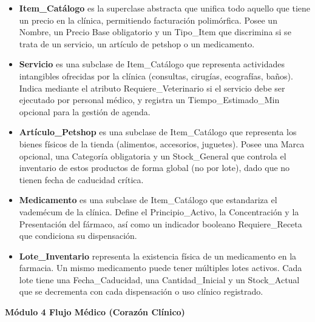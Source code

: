 \begin{itemize}
	\item \textbf{Item\_Catálogo} es la superclase abstracta que unifica todo aquello que tiene un precio en la clínica, permitiendo facturación polimórfica. Posee un Nombre, un Precio Base obligatorio y un Tipo\_Item que discrimina si se trata de un servicio, un artículo de petshop o un medicamento.
	\item \textbf{Servicio} es una subclase de Item\_Catálogo que representa actividades intangibles ofrecidas por la clínica (consultas, cirugías, ecografías, baños). Indica mediante el atributo Requiere\_Veterinario si el servicio debe ser ejecutado por personal médico, y registra un Tiempo\_Estimado\_Min opcional para la gestión de agenda.
	\item \textbf{Artículo\_Petshop} es una subclase de Item\_Catálogo que representa los bienes físicos de la tienda (alimentos, accesorios, juguetes). Posee una Marca opcional, una Categoría obligatoria y un Stock\_General que controla el inventario de estos productos de forma global (no por lote), dado que no tienen fecha de caducidad crítica.
	\item \textbf{Medicamento} es una subclase de Item\_Catálogo que estandariza el vademécum de la clínica. Define el Principio\_Activo, la Concentración y la Presentación del fármaco, así como un indicador booleano Requiere\_Receta que condiciona su dispensación.
	\item \textbf{Lote\_Inventario} representa la existencia física de un medicamento en la farmacia. Un mismo medicamento puede tener múltiples lotes activos. Cada lote tiene una Fecha\_Caducidad, una Cantidad\_Inicial y un Stock\_Actual que se decrementa con cada dispensación o uso clínico registrado.
\end{itemize}

\vspace{0.5cm}
\noindent \textbf{Módulo 4 Flujo Médico (Corazón Clínico)}

